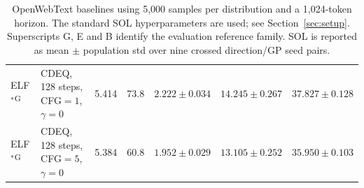 \begin{table}[h]
{\begin{tabular}{@{}llrrrrr@{}}
      \addlinespace[2pt]

      ELF$^{*}$\textsuperscript{G}
      & CDEQ, 128 steps, CFG$=1$, $\gamma=0$ & 5.414 & 73.8
      & $2.222 \pm 0.034$
      & $14.245 \pm 0.267$
      & $37.827 \pm 0.128$ \\

      ELF$^{*}$\textsuperscript{G}
      & CDEQ, 128 steps, CFG$=5$, $\gamma=0$ & 5.384 & 60.8
      & $1.952 \pm 0.029$
      & $13.105 \pm 0.252$
      & $35.950 \pm 0.103$ \\



      \bottomrule
    \end{tabular}%
    }
    \caption{\small
      OpenWebText baselines using 5,000 samples per distribution and a
      1,024-token horizon. The standard SOL hyperparameters are used;
      see Section~\ref{sec:setup}.
      Superscripts G, E and B identify the evaluation reference family.
      SOL is reported as mean $\pm$ population std over
      nine crossed direction/GP seed pairs.
    }
    \label{tab:experiment-8d-owt-baselines}
  \end{table}

